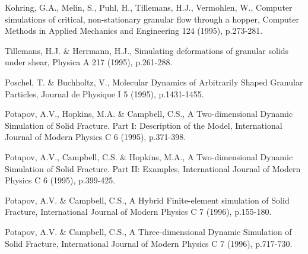 \documentclass[granma]{svjour}
\begin{document}
\begin{thebibliography}{19}
  Kohring, G.A., Melin, S., Puhl, H.,
Tillemans, H.J.,
Vermohlen, W., Computer simulations of critical, non-stationary granular flow
through a hopper, Computer Methods in Applied Mechanics and Engineering 124
(1995), p.273-281.

 Tillemans, H.J. \& Herrmann, H.J., Simulating deformations
of granular solids under shear, Physica A 217 (1995), p.261-288.
\newpage

 Poschel, T. \& Buchholtz, V., Molecular Dynamics of
Arbitrarily Shaped Granular Particles, Journal de Physique I 5 (1995),
p.1431-1455.

 Potapov, A.V., Hopkins, M.A. \& Campbell, C.S., A
Two-dimensional Dynamic Simulation of Solid Fracture.
Part I: Description of the Model, International Journal of Modern
Physics C 6 (1995), p.371-398.

 Potapov, A.V., Campbell, C.S. \& Hopkins, M.A., A
Two-dimensional Dynamic Simulation of Solid Fracture. Part II: Examples,
International Journal of Modern Physics C 6 (1995), p.399-425.

 Potapov, A.V. \& Campbell, C.S., A Hybrid
Finite-element
simulation of Solid Fracture, International Journal of Modern Phy\-sics C 7
(1996), p.155-180.

 Potapov, A.V. \& Campbell, C.S., A Three-dimensional
Dynamic Simulation of Solid Fracture, International Journal of Modern Physics
C 7 (1996), p.717-730.

\end{thebibliography}
\end{document}
